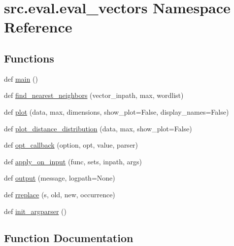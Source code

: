 \hypertarget{namespacesrc_1_1eval_1_1eval__vectors}{}\section{src.\+eval.\+eval\+\_\+vectors Namespace Reference}
\label{namespacesrc_1_1eval_1_1eval__vectors}
\subsection*{Functions}
\begin{DoxyCompactItemize}
\item 
def \hyperlink{namespacesrc_1_1eval_1_1eval__vectors_a3ccd3f48a0989935dc27045a598737df}{main} ()
\item 
def \hyperlink{namespacesrc_1_1eval_1_1eval__vectors_a3cf87b490f0d115602b0511b02960c5a}{find\+\_\+nearest\+\_\+neighbors} (vector\+\_\+inpath, max, wordlist)
\item 
def \hyperlink{namespacesrc_1_1eval_1_1eval__vectors_a6168d2cb3dff1d01ff10ed4127850dec}{plot} (data, max, dimensions, show\+\_\+plot=False, display\+\_\+names=False)
\item 
def \hyperlink{namespacesrc_1_1eval_1_1eval__vectors_a279f181f952a4d6365293688afbb5355}{plot\+\_\+distance\+\_\+distribution} (data, max, show\+\_\+plot=False)
\item 
def \hyperlink{namespacesrc_1_1eval_1_1eval__vectors_ad6d96a02ca305eccf4e2f45dae69ad58}{opt\+\_\+callback} (option, opt, value, parser)
\item 
def \hyperlink{namespacesrc_1_1eval_1_1eval__vectors_aeec8ba68a1e7aef91b52c1ca32642ab8}{apply\+\_\+on\+\_\+input} (func, sets, inpath, args)
\item 
def \hyperlink{namespacesrc_1_1eval_1_1eval__vectors_acbe16d31d9d730b59c114a528f4fb64d}{output} (message, logpath=None)
\item 
def \hyperlink{namespacesrc_1_1eval_1_1eval__vectors_abed4618328dd07d5e688310742b194ae}{rreplace} (s, old, new, occurrence)
\item 
def \hyperlink{namespacesrc_1_1eval_1_1eval__vectors_afc3aa8c78c129a423c6d8cc134d7d1f8}{init\+\_\+argparser} ()
\end{DoxyCompactItemize}


\subsection{Function Documentation}

